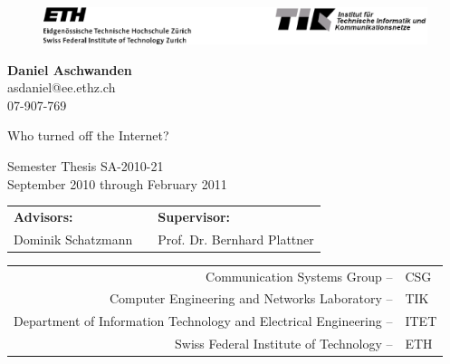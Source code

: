 \begin{titlepage}

  \begin{center}
  \begin{figure}[!t]
  \includegraphics[width=\textwidth]{images/TIKETHhdr.eps}
  \end{figure}
  \end{center}

	\vspace{2mm}
  \textbf{Daniel Aschwanden}\\
  asdaniel@ee.ethz.ch\\
  07-907-769
  \vspace{2mm}

  {\Huge \begin{flushleft}
         Who turned off the Internet?\\
         \end{flushleft}
 }
\vspace{3mm}
\centering

\vspace{3mm}

Semester Thesis SA-2010-21\\
September 2010 through February 2011\\

\vspace{5mm}

\begin{tabular}{l p{} l}
\textbf{Advisors:} && \textbf{Supervisor:} \\
Dominik Schatzmann && Prof. Dr. Bernhard Plattner\\
\end{tabular}

\vspace{5mm}
\raggedleft
\begin{tabular}{rl}
Communication Systems Group --& CSG\\
Computer Engineering and Networks Laboratory --&TIK\\
Department of Information Technology and Electrical Engineering --& ITET\\
Swiss Federal Institute of Technology -- & ETH\\
\end{tabular}


\end{titlepage}
